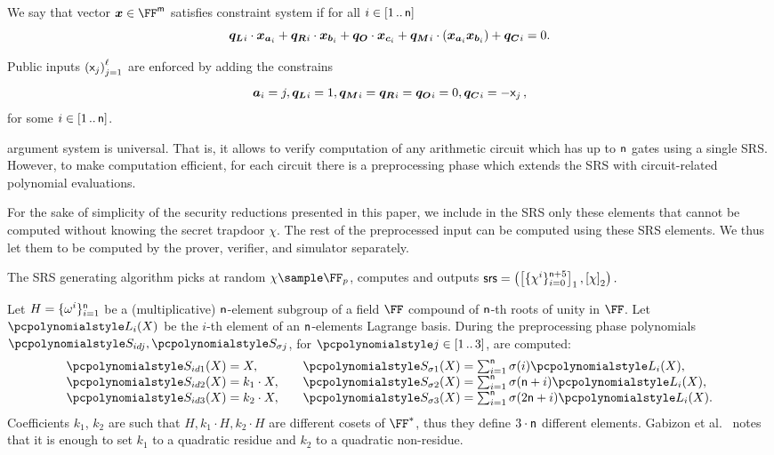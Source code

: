 We say that vector $\vx \in \FF^\noofw$ satisfies constraint system if for all $i
\in [1 \, .. \, \mathsf{n}]$
\[
  \vql_i \cdot \vx_{\va_i} + \vqr_i \cdot \vx_{\vb_i} + \vqo \cdot \vx_{\vc_i} +
  \vqm_i \cdot (\vx_{\va_i} \vx_{\vb_i}) + \vqc_i = 0. 
\]

Public inputs $\left(\mathsf{x}_j\right)_{j = 1}^{\mathsf{\ell}}$ are enforced by adding the constrains
\[ \va_i = j, \vql_i = 1, \vqm_i = \vqr_i = \vqo_i = 0, \vqc_i = -\inp_j\,,
\]
for some $i \in [1 \, .. \, \mathsf{n}]$.

\label{sec:plonk_explained}
\plonk{} argument system is universal. That is, it allows to verify computation
of any arithmetic circuit which has up to $\mathsf{n}$
gates using a single SRS. However, to make computation efficient, for each
circuit there is a preprocessing phase which extends the SRS with
circuit-related polynomial evaluations.

For the sake of simplicity of the security reductions presented in this paper, we
include in the SRS only these elements that cannot be computed without knowing
the secret trapdoor $\chi$. The rest of the preprocessed input can
be computed using these SRS elements. We thus let them to be computed by the
prover, verifier, and simulator separately.

The SRS generating algorithm picks at random $\chi \sample \FF_p$, computes
and outputs
\(
	\mathsf{srs} = \left(\left[\{\chi^i\}_{i = 0}^{\mathsf{n} + 5}\right]_{1},
	\left[\chi\right]_{2} \right).
\)

Let $H = \{\omega^i\}_{i = 1}^{\mathsf{n} }$ be a
(multiplicative) $\mathsf{n}$-element subgroup of a field $\FF$
compound of $\mathsf{n}$-th roots of unity in $\FF$. Let $\lag_i(X)$ be
the $i$-th element of an $\mathsf{n}$-elements Lagrange basis. During
the preprocessing phase polynomials $\p{S_{id j}}, \p{S_{\sigma j}}$, for
$\p{j} \in \range{1}{3}$, are computed:
\begin{equation*}
  \begin{aligned}
    \p{S_{id 1}}(X) & = X,\\[\myskip]
    \p{S_{id 2}}(X) & = k_1 \cdot X,\\[\myskip]
    \p{S_{id 3}}(X) & = k_2 \cdot X,
  \end{aligned}
  \qquad
\begin{aligned}
  \p{S_{\sigma 1}}(X) & = {\textstyle{\sum_{i = 1}^{\noofc} \sigma(i) \lag_i(X)}},\\[\myskip]
  \p{S_{\sigma 2}}(X) & = {\textstyle \sum_{i = 1}^{\noofc}
  \sigma(\noofc + i) \lag_i(X)},\\[\myskip]
  \p{S_{\sigma 3}}(X) & ={\textstyle\sum_{i = 1}^{\noofc} \sigma(2 \noofc + i) \lag_i(X)}.
\end{aligned}
\end{equation*}
Coefficients $k_1$, $k_2$ are such that $H, k_1 \cdot H, k_2 \cdot H$ are
different cosets of $\FF^*$, thus they define $3 \cdot \mathsf{n}$
different elements. Gabizon et al.~\cite{EPRINT:GabWilCio19} notes that it is enough to set
$k_1$ to a quadratic residue and $k_2$ to a quadratic non-residue.


